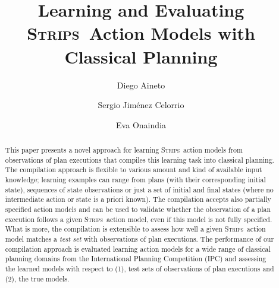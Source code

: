 \documentclass[3p,times]{elsarticle}
\newcommand{\strips}{\textsc{Strips}}     %
\begin{document}
\begin{frontmatter}



\dochead{}

\title{Learning and Evaluating \strips\ Action Models with Classical Planning}
\author[label1]{Diego Aineto}
\author[label1]{Sergio Jim\'{e}nez Celorrio}
\author[label1]{Eva Onaindia}
\address[label1]{Department of Computer Systems and Computation, Universitat Polit\`ecnica de Val\`encia. Spain}




\begin{abstract}
  This paper presents a novel approach for learning \strips\ action models from observations of plan executions that compiles this learning task into classical planning. The compilation approach is flexible to various amount and kind of available input knowledge; learning examples can range from plans (with their corresponding initial state), sequences of state observations or just a set of initial and final states (where no intermediate action or state is a priori known). The compilation accepts also partially specified action models and can be used to validate whether the observation of a plan execution follows a given \strips\ action model, even if this model is not fully specified. What is more, the compilation is extensible to assess how well a given \strips\ action model matches a {\em test set} with observations of plan executions. The performance of our compilation approach is evaluated learning action models for a wide range of classical planning domains from the International Planning Competition (IPC) and assessing the learned models with respect to (1), test sets of observations of plan executions and (2), the true models.
\end{abstract}


\end{frontmatter}
\end{document}
